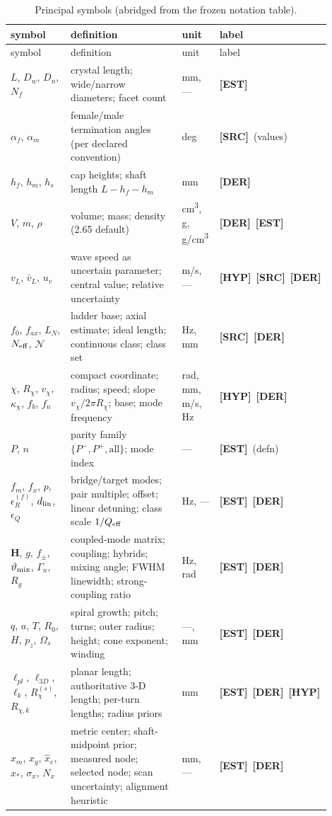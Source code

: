 \documentclass[10pt,letterpaper]{article}
\newcommand{\cltag}[2]{\textcolor{#1}{{\fontspec{TeX Gyre Heros}\scriptsize\bfseries[#2]}}}
\newcommand{\EST}{\cltag{estcol}{EST}}   %
\newcommand{\DER}{\cltag{dercol}{DER}}   %
\newcommand{\HYP}{\cltag{hypcol}{HYP}}   %
\newcommand{\SRC}{\cltag{srccol}{SRC}}   %
\newcommand{\epsR}{\epsilon_{R}^{(f)}}
\newcommand{\Rchi}{R_{\chi}}
\newcommand{\vchi}{v_{\chi}}
\newcommand{\kchi}{\kappa_{\chi}}
\newcommand{\fb}{f_{b}}
\newcommand{\vL}{v_{L}}
\newcommand{\vbarL}{\bar{v}_{L}}
\newcommand{\uv}{u_{v}}
\begin{document}
\small
\begin{longtable}{@{}p{0.22\linewidth} p{0.44\linewidth} p{0.12\linewidth} p{0.12\linewidth}@{}}
\caption{Principal symbols (abridged from the frozen notation table).}\\
\toprule
symbol & definition & unit & label \\
\midrule
\endfirsthead
\toprule
symbol & definition & unit & label \\
\midrule
\endhead
$L$, $D_w$, $D_n$, $N_f$ & crystal length; wide/narrow diameters; facet count & mm, — & \EST \\
$\alpha_f$, $\alpha_m$ & female/male termination angles (per declared convention) & deg & \SRC\ (values) \\
$h_f$, $h_m$, $h_s$ & cap heights; shaft length $L - h_f - h_m$ & mm & \DER \\
$V$, $m$, $\rho$ & volume; mass; density (2.65 default) & cm\textsuperscript{3}, g, g/cm\textsuperscript{3} & \DER\ \EST \\
$\vL$, $\vbarL$, $\uv$ & wave speed as uncertain parameter; central value; relative uncertainty & \si{m/s}, — & \HYP\ \SRC\ \DER \\
$f_0$, $f_{ax}$, $L_N$, $N_{\rm eff}$, $\mathcal{N}$ & ladder base; axial estimate; ideal length; continuous class; class set & Hz, mm & \SRC\ \DER \\
$\chi$, $\Rchi$, $\vchi$, $\kchi$, $\fb$, $f_n$ & compact coordinate; radius; speed; slope $\vchi/2\pi\Rchi$; base; mode frequency & rad, mm, \si{m/s}, Hz & \HYP\ \DER \\
$P$, $n$ & parity family $\{P^-, P^+, \text{all}\}$; mode index & — & \EST\ (defn) \\
$f_m$, $f_x$, $p$, $\epsR$, $d_{\rm lin}$, $\epsilon_Q$ & bridge/target modes; pair multiple; offset; linear detuning; class scale $1/Q_{\rm eff}$ & Hz, — & \EST\ \DER \\
$\mathbf{H}$, $g$, $f_\pm$, $\vartheta_{\rm mix}$, $\Gamma_n$, $R_g$ & coupled-mode matrix; coupling; hybrids; mixing angle; FWHM linewidth; strong-coupling ratio & Hz, rad & \EST\ \DER \\
$q$, $a$, $T$, $R_0$, $H$, $p_z$, $\Omega_s$ & spiral growth; pitch; turns; outer radius; height; cone exponent; winding & —, mm & \EST\ \DER \\
$\ell_{pl}$, $\ell_{3D}$, $\ell_k$, $R_\chi^{(s)}$, $R_{\chi,k}$ & planar length; authoritative 3-D length; per-turn lengths; radius priors & mm & \EST\ \DER\ \HYP \\
$x_m$, $x_g$, $\hat x_e$, $x_\ast$, $\sigma_x$, $N_x$ & metric center; shaft-midpoint prior; measured node; selected node; scan uncertainty; alignment heuristic & mm, — & \EST\ \DER \\

\end{longtable}
\end{document}

